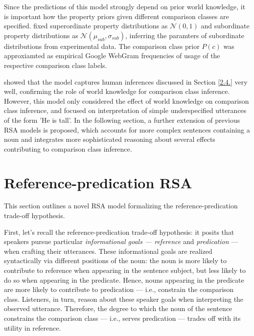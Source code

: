 Since the predictions of this model strongly depend on prior world knowledge, it is important how the property priors given different comparison classes are specified. \textcite{tessler2017warm} fixed superordinate property distributions as $\mathcal{N} (0, 1)$ and subordinate property distributions as $\mathcal{N}(\mu_{sub}, \sigma_{sub})$, inferring the paramters of subordinate distributions from experimental data. The comparison class prior $P(c)$ was approxiamted as empirical Google WebGram frequencies of usage of the respective comparison class labels. 

\textcite{tessler2017warm} showed that the model captures human inferences discussed in Section \ref{2.4.} very well, confirming the role of world knowledge for comparison class inference. 
However, this model only considered the effect of world knowledge on comparison class inference, and focused on interpretation of simple underspecified utterances of the form 'He is tall'. In the following section, a further extension of previous RSA models is proposed, which accounts for more complex sentences containing a noun and integrates more sophisticated reasoning about several effects contributing to comparison class inference.  

\section{Reference-predication RSA}
This section outlines a novel RSA model formalizing the reference-predication trade-off hypothesis.

First, let's recall the reference-predication trade-off hypothesis: it posits that speakers pursue particular \emph{informational goals --- reference} and \emph{predication} --- when crafting their utterances. These informational goals are realized syntactically via different positions of the noun: the noun is more likely to contribute to reference when appearing in the sentence subject, but less likely to do so when appearing in the predicate. Hence, nouns appearing in the predicate are more likely to contribute to predication --- i.e., constrain the comparison class. Listeners, in turn, reason about these speaker goals %
when interpreting the observed utterance.  
Therefore, the degree to which the noun of the sentence constrains the comparison class --- i.e., serves predication --- trades off with its utility in reference. 

